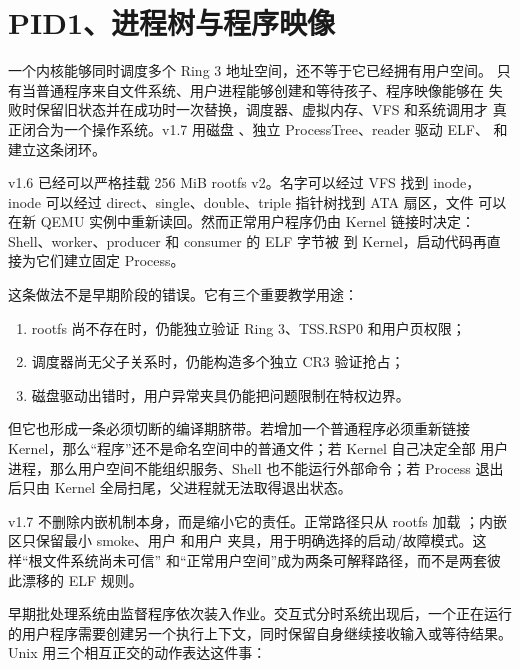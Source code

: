 \section{PID1、进程树与程序映像}

\begin{keyidea}
一个内核能够同时调度多个 Ring 3 地址空间，还不等于它已经拥有用户空间。
只有当普通程序来自文件系统、用户进程能够创建和等待孩子、程序映像能够在
失败时保留旧状态并在成功时一次替换，调度器、虚拟内存、VFS 和系统调用才
真正闭合为一个操作系统。v1.7 用磁盘 、独立
ProcessTree、reader 驱动 ELF、 和
 建立这条闭环。
\end{keyidea}

v1.6 已经可以严格挂载 256 MiB rootfs v2。名字可以经过 VFS 找到 inode，
inode 可以经过 direct、single、double、triple 指针树找到 ATA 扇区，文件
可以在新 QEMU 实例中重新读回。然而正常用户程序仍由 Kernel 链接时决定：
Shell、worker、producer 和 consumer 的 ELF 字节被  到
Kernel，启动代码再直接为它们建立固定 Process。

这条做法不是早期阶段的错误。它有三个重要教学用途：

\begin{enumerate}
  \item rootfs 尚不存在时，仍能独立验证 Ring 3、TSS.RSP0 和用户页权限；
  \item 调度器尚无父子关系时，仍能构造多个独立 CR3 验证抢占；
  \item 磁盘驱动出错时，用户异常夹具仍能把问题限制在特权边界。
\end{enumerate}

但它也形成一条必须切断的编译期脐带。若增加一个普通程序必须重新链接
Kernel，那么“程序”还不是命名空间中的普通文件；若 Kernel 自己决定全部
用户进程，那么用户空间不能组织服务、Shell 也不能运行外部命令；若 Process
退出后只由 Kernel 全局扫尾，父进程就无法取得退出状态。

v1.7 不删除内嵌机制本身，而是缩小它的责任。正常路径只从 rootfs 加载
；内嵌区只保留最小 smoke、用户  和用户
 夹具，用于明确选择的启动/故障模式。这样“根文件系统尚未可信”
和“正常用户空间”成为两条可解释路径，而不是两套彼此漂移的 ELF 规则。

早期批处理系统由监督程序依次装入作业。交互式分时系统出现后，一个正在运行
的用户程序需要创建另一个执行上下文，同时保留自身继续接收输入或等待结果。
Unix 用三个相互正交的动作表达这件事：

